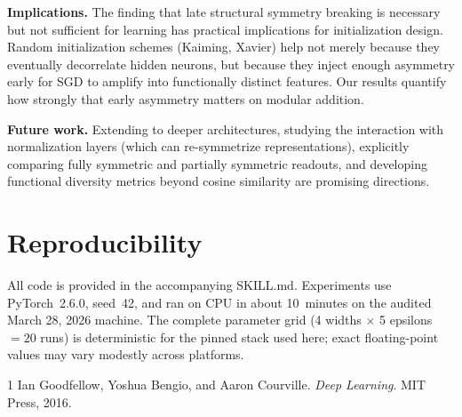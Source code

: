 \documentclass[11pt,a4paper]{article}
\begin{document}
\textbf{Implications.}
The finding that late structural symmetry breaking is necessary but not sufficient for learning has practical implications for initialization design. Random initialization schemes (Kaiming, Xavier) help not merely because they eventually decorrelate hidden neurons, but because they inject enough asymmetry early for SGD to amplify into functionally distinct features. Our results quantify how strongly that early asymmetry matters on modular addition.

\textbf{Future work.}
Extending to deeper architectures, studying the interaction with normalization layers (which can re-symmetrize representations), explicitly comparing fully symmetric and partially symmetric readouts, and developing functional diversity metrics beyond cosine similarity are promising directions.

\section{Reproducibility}

All code is provided in the accompanying SKILL.md. Experiments use PyTorch~2.6.0, seed~42, and ran on CPU in about 10~minutes on the audited March 28, 2026 machine.
The complete parameter grid (4 widths $\times$ 5 epsilons $= 20$ runs) is deterministic for the pinned stack used here; exact floating-point values may vary modestly across platforms.


\begin{thebibliography}{1}
Ian Goodfellow, Yoshua Bengio, and Aaron Courville.
\newblock \emph{Deep Learning}.
\newblock MIT Press, 2016.
\end{thebibliography}
\end{document}
